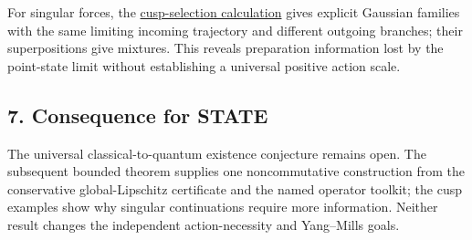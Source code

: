 \documentclass[11pt,a4paper]{article}
\begin{document}
For singular forces, the
\href{cusp-quantum-preparation-selection.md}{cusp-selection calculation}
gives explicit Gaussian families with the same limiting incoming
trajectory and different outgoing branches; their superpositions give
mixtures. This reveals preparation information lost by the point-state
limit without establishing a universal positive action scale.

\hypertarget{consequence-for-state}{%
\subsection{7. Consequence for STATE}\label{consequence-for-state}}

The universal classical-to-quantum existence conjecture remains open.
The subsequent bounded theorem supplies one noncommutative construction
from the conservative global-Lipschitz certificate and the named
operator toolkit; the cusp examples show why singular continuations
require more information. Neither result changes the independent
action-necessity and Yang--Mills goals.
\end{document}
